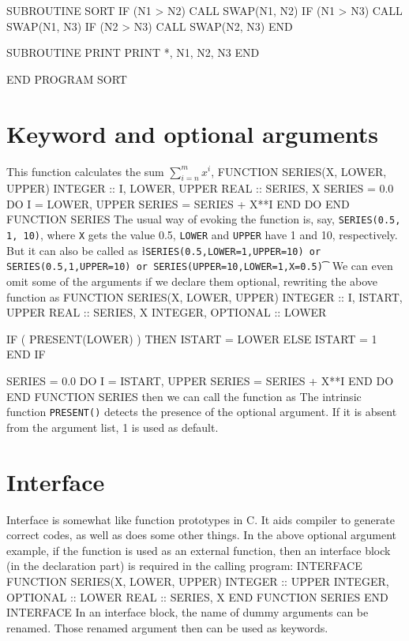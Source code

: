 {   SUBROUTINE SORT
      IF (N1 > N2) CALL SWAP(N1, N2)
      IF (N1 > N3) CALL SWAP(N1, N3)
      IF (N2 > N3) CALL SWAP(N2, N3)
   END

   SUBROUTINE PRINT
      PRINT *, N1, N2, N3
   END 

END PROGRAM SORT
\tted     

\section{Keyword and optional arguments}
This function calculates the sum $\sum_{i = n}^m x^i$,
\ttbg
FUNCTION SERIES(X, LOWER, UPPER)
   INTEGER :: I, LOWER, UPPER
   REAL :: SERIES, X
   SERIES = 0.0
   DO I = LOWER, UPPER
      SERIES = SERIES + X**I
   END DO
END FUNCTION SERIES
\tted
The usual way of evoking the function is, say, {\tt SERIES(0.5, 1, 10)}, 
where {\tt X} gets the value 0.5, {\tt LOWER} and {\tt UPPER} have
1 and 10, respectively.  But it can also be called as
\sms
\l{\t\tt SERIES(0.5,LOWER=1,UPPER=10) \hfill {\rm or}
\hfill SERIES(0.5,1,UPPER=10) \hfill {\rm or}  \hfill
SERIES(UPPER=10,LOWER=1,X=0.5)\t}
\sms
We can even omit some of the arguments if we declare them optional,
rewriting the  above function as 
\ttbg
FUNCTION SERIES(X, LOWER, UPPER)
   INTEGER :: I, ISTART, UPPER
   REAL :: SERIES, X
   INTEGER, OPTIONAL :: LOWER
   
   IF ( PRESENT(LOWER) ) THEN
      ISTART = LOWER
   ELSE
      ISTART = 1
   END IF

   SERIES = 0.0
   DO I = ISTART, UPPER
      SERIES = SERIES + X**I
   END DO
END FUNCTION SERIES
\tted
then we can call the function as
\sms
{}
\sms
The intrinsic function {\tt PRESENT()} detects the presence of the 
optional argument.  If it is absent from the argument list, 1 is
used as default. 

\section{Interface}
Interface is somewhat like function prototypes in C.  It  aids compiler
to generate correct codes, as well as does some other things.  
In the above optional argument example, if the 
function is used as an external function, then an interface block (in the
declaration part) is required in the calling program:
\ttbg
INTERFACE
   FUNCTION SERIES(X, LOWER, UPPER)
      INTEGER :: UPPER
      INTEGER, OPTIONAL :: LOWER
      REAL :: SERIES, X
   END FUNCTION SERIES
END INTERFACE
\tted
In an interface block, the name of dummy arguments can be renamed.  Those
renamed argument then can be used as keywords.

}

